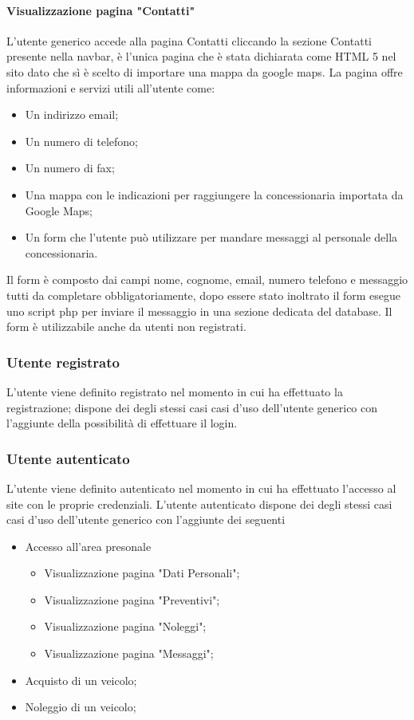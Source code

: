         \paragraph{Visualizzazione pagina "Contatti"}
        L’utente generico accede alla pagina Contatti cliccando la sezione Contatti presente nella navbar, è l'unica pagina che è stata dichiarata come HTML 5 nel sito dato che sì è scelto di importare una mappa da google maps. La pagina offre informazioni e servizi utili all’utente come:
        \begin{itemize}
            \item Un indirizzo email;
            \item Un numero di telefono;
            \item Un numero di fax;
            \item Una mappa con le indicazioni per raggiungere la concessionaria importata da Google Maps;
            \item Un form che l’utente può utilizzare per mandare messaggi al personale della concessionaria.
        \end{itemize}
        Il form è composto dai campi nome, cognome, email, numero telefono e messaggio tutti da completare obbligatoriamente, dopo essere stato inoltrato il form esegue uno script php per inviare il messaggio in una sezione dedicata del database. Il form è utilizzabile anche da utenti non registrati.

        \subsubsection{Utente registrato}
        L’utente viene definito registrato nel momento in cui ha effettuato la registrazione; dispone dei degli stessi casi casi d’uso dell'utente generico con l'aggiunte della possibilità di effettuare il login.

        \subsubsection{Utente autenticato}
        L’utente viene definito autenticato nel momento in cui ha effettuato l'accesso al site con le proprie credenziali.
        L’utente autenticato dispone dei degli stessi casi casi d’uso dell'utente generico con l'aggiunte dei seguenti
        \begin{itemize}
            \item Accesso all'area presonale
            \begin{itemize}
                \item Visualizzazione pagina "Dati Personali";
                \item Visualizzazione pagina "Preventivi";
                \item Visualizzazione pagina "Noleggi";
                \item Visualizzazione pagina "Messaggi";
            \end{itemize}
            \item Acquisto di un veicolo;
            \item Noleggio di un veicolo;
        \end{itemize}


